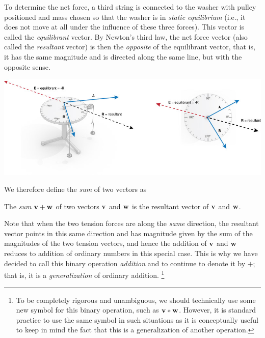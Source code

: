 \documentclass[12pt,letterpaper,reqno]{article}
\numberwithin{equation}{section}
\newcommand{\ti}[1]{\textit{#1}}
\begin{document}
To determine the net force, a third string is connected to the washer with pulley positioned and mass chosen so that the washer is in \ti{static equilibrium} (i.e., it does not move at all under the influence of these three forces). This vector is called the \ti{equilibrant} vector. By Newton's third law, the net force vector (also called the \ti{resultant} vector) is then the \ti{opposite} of the equilibrant vector, that is, it has the same magnitude and is directed along the same line, but with the opposite sense.

\begin{center}
	\includegraphics[scale=0.5]{figures_mvc/force-table-equi-res}
\end{center}

 We therefore define the \ti{sum} of two vectors as  
 
 \begin{defn}
 	The \ti{sum} ${\bf v}+{\bf w}$ of two vectors ${\bf v}$ and ${\bf w}$ is the resultant vector of ${\bf v}$ and ${\bf w}$.
 \end{defn}
Note that when the two tension forces are along the \ti{same} direction, the resultant vector points in this same direction and has magnitude given by the sum of the magnitudes of the two tension vectors, and hence the addition of ${\bf v}$ and ${\bf w}$ reduces to addition of ordinary numbers in this special case. This is why we have decided to call this binary operation \ti{addition} and to continue to denote it by $+$; that is, it is a \ti{generalization} of ordinary addition. \footnote{To be completely rigorous and unambiguous, we should technically use some new symbol for this binary operation, such as ${\bf v}*{\bf w}$. However, it is standard practice to use the same symbol in such situations as it is conceptually useful to keep in mind the fact that this is a generalization of another operation.}
 
\end{document}
